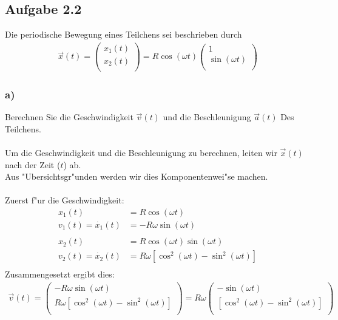\documentclass{theozettel}
\begin{document}
\newpage
\subsection*{Aufgabe 2.2}Die periodische Bewegung eines Teilchens sei beschrieben durch
	\begin{align*}	
	\vec{x}\left(t\right) =
	\begin{pmatrix}
	x_1\left(t\right)\\
	x_2\left(t\right)\\
	\end{pmatrix}
	= R \cos\left(\omega t \right)
	\begin{pmatrix}
	1\\
	\sin\left(\omega t\right)\\
	\end{pmatrix}
	\end{align*}
	\subsubsection*{a)}Berechnen Sie die Geschwindigkeit $\vec{v}\left(t\right)$ und die Beschleunigung $\vec{a}\left(t\right)$ Des Teilchens.\\\\
	Um die Geschwindigkeit und die Beschleunigung zu berechnen, leiten wir $\vec{x}\left(t\right)$ nach der Zeit ($t$) ab.\\
	Aus "Ubersichtsgr"unden werden wir dies Komponentenwei"se machen.\\\\
	Zuerst f"ur die Geschwindigkeit:
	\begin{align*}
	x_1\left(t\right) &= R \cos\left(\omega t\right)\\
	 v_1\left(t\right) =\dot{x_1}\left(t\right) &= - R \omega \sin\left(\omega t\right)\\\\	 
	 x_2\left(t\right) &= R \cos\left(\omega t\right)\sin\left(\omega t\right)\\
	 v_2\left(t\right) =\dot{x_2}\left(t\right) &=  R \omega \left[\cos^2\left(\omega t\right) - \sin^2\left(\omega t\right)\right]\\
	\end{align*}
	Zusammengesetzt ergibt dies:
	\begin{align*}	
	\vec{v}\left(t\right) =
	\begin{pmatrix}
	- R \omega \sin\left(\omega t\right)\\
	R \omega \left[\cos^2\left(\omega t\right) - \sin^2\left(\omega t\right)\right]\\
	\end{pmatrix}
	= R\omega
	\begin{pmatrix}
	-\sin\left(\omega t\right)\\
	\left[\cos^2\left(\omega t\right) - \sin^2\left(\omega t\right)\right]\\
	\end{pmatrix}
	\end{align*}
	
\end{document}
